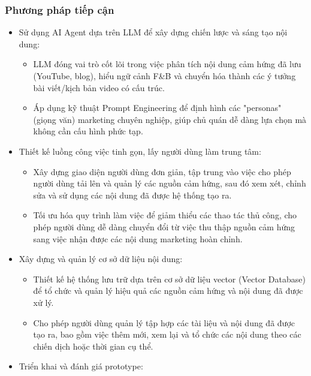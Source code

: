 \subsubsection{Phương pháp tiếp
cận}\label{phux1b0ux1a1ng-phuxe1p-tiux1ebfp-cux1eadn}

\begin{itemize}
\item
  Sử dụng AI Agent dựa trên LLM để xây dựng chiến lược và sáng tạo nội
  dung:

  \begin{itemize}
  \item
    LLM đóng vai trò cốt lõi trong việc phân tích nội dung cảm hứng đã
    lưu (YouTube, blog), hiểu ngữ cảnh F\&B và chuyển hóa thành các ý
    tưởng bài viết/kịch bản video có cấu trúc.
  \item
    Áp dụng kỹ thuật Prompt Engineering để định hình các "personas"
    (giọng văn) marketing chuyên nghiệp, giúp chủ quán dễ dàng lựa chọn
    mà không cần cấu hình phức tạp.
  \end{itemize}
\item
  Thiết kế luồng công việc tinh gọn, lấy người dùng làm trung tâm:

  \begin{itemize}
  \item
    Xây dựng giao diện người dùng đơn giản, tập trung vào việc cho phép
    người dùng tải lên và quản lý các nguồn cảm hứng, sau đó xem xét,
    chỉnh sửa và sử dụng các nội dung đã được hệ thống tạo ra.
  \item
    Tối ưu hóa quy trình làm việc để giảm thiểu các thao tác thủ công,
    cho phép người dùng dễ dàng chuyển đổi từ việc thu thập nguồn cảm
    hứng sang việc nhận được các nội dung marketing hoàn chỉnh.
  \end{itemize}
\item
  Xây dựng và quản lý cơ sở dữ liệu nội dung:

  \begin{itemize}
  \item
    Thiết kế hệ thống lưu trữ dựa trên cơ sở dữ liệu vector (Vector
    Database) để tổ chức và quản lý hiệu quả các nguồn cảm hứng và nội
    dung đã được xử lý.
  \item
    Cho phép người dùng quản lý tập hợp các tài liệu và nội dung đã được
    tạo ra, bao gồm việc thêm mới, xem lại và tổ chức các nội dung theo
    các chiến dịch hoặc thời gian cụ thể.
  \end{itemize}
\item
  Triển khai và đánh giá prototype:


\end{itemize}
